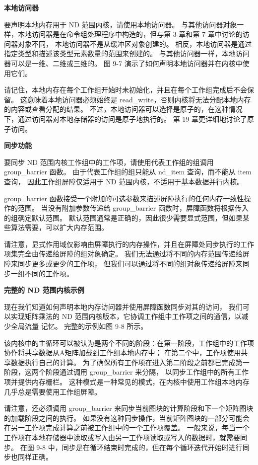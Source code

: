 \textbf{本地访问器}

要声明本地内存用于 ND 范围内核，请使用本地访问器。 
与其他访问器对象一样，本地访问器是在命令组处理程序中构造的，但与第 3 章和第 7 章中讨论的访问器对象不同，
本地访问器不是从缓冲区对象创建的。 相反，本地访问器是通过指定类型和描述该类型元素数量的范围来创建的。 
与其他访问器一样，本地访问器可以是一维、二维或三维的。 图 9-7 演示了如何声明本地访问器并在内核中使用它们。

请记住，本地内存在每个工作组开始时未初始化，并且在每个工作组完成后不会保留。 
这意味着本地访问器必须始终是 read\_write，否则内核将无法分配本地内存的内容或查看分配的结果。 
不过，本地访问器可以选择是原子的，在这种情况下，通过访问器对本地存储器的访问是原子地执行的。 
第 19 章更详细地讨论了原子访问。

\textbf{同步功能}

要同步 ND 范围内核工作组中的工作项，请使用代表工作组的组调用 group\_barrier 函数。 
由于代表工作组的组只能从 nd\_item 查询，而不能从 item 查询，
因此工作组屏障仅适用于 ND 范围内核，不适用于基本数据并行内核。

group\_barrier 函数接受一个附加的可选参数来描述屏障执行的任何内存一致性操作的范围。 
当没有附加参数传递给 group\_barrier 函数时，屏障函数将根据传入的组确定默认范围。 
默认范围通常是正确的，因此很少需要显式范围，但如果某些算法需要，可以扩大内存范围。

请注意，显式作用域仅影响由屏障执行的内存操作，并且在屏障处同步执行的工作项集完全由传递给屏障的组对象确定。 
我们无法通过将不同的内存范围传递给屏障来同步更多或更少的工作项，
但我们可以通过将不同的组对象传递给屏障来同步一组不同的工作项。

\textbf{完整的 ND 范围内核示例}

现在我们知道如何声明本地内存访问器并使用屏障函数同步对其的访问，
我们可以实现矩阵乘法的 ND 范围内核版本，它协调工作组中工作项之间的通信，以减少全局流量 记忆。 
完整的示例如图 9-8 所示。

该内核中的主循环可以被认为是两个不同的阶段：在第一阶段，工作组中的工作项协作将共享数据从A矩阵加载到工作组本地内存中； 
在第二个中，工作项使用共享数据执行自己的计算。 
为了确保所有工作项在进入第二阶段之前都已完成第一阶段，这两个阶段通过调用 group\_barrier 来分隔，
以同步工作组中的所有工作项并提供内存栅栏。 
这种模式是一种常见的模式，在内核中使用工作组本地内存几乎总是需要使用工作组屏障。

请注意，还必须调用 group\_barrier 来同步当前图块的计算阶段和下一个矩阵图块的加载阶段之间的执行。 
如果没有这种同步操作，当前矩阵图块的一部分可能会在另一工作项完成计算之前被工作组中的一个工作项覆盖。 
一般来说，每当一个工作项在本地存储器中读取或写入由另一工作项读取或写入的数据时，就需要同步。 
在图 9-8 中，同步是在循环结束时完成的，但在每个循环迭代开始时进行同步也同样正确。

